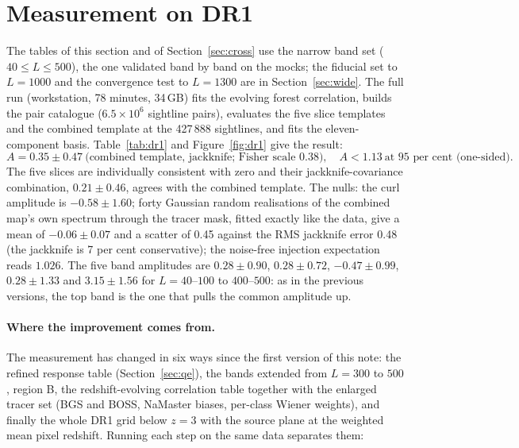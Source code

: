 \documentclass[11pt,a4paper]{article}
\begin{document}
\section{Measurement on DR1}
\label{sec:result}
The tables of this section and of Section~\ref{sec:cross} use the narrow band set ($40\le L\le500$), the one validated band by band on the mocks; the fiducial set to $L=1000$ and the convergence test to $L=1300$ are in Section~\ref{sec:wide}. The full run (workstation, 78 minutes, 34\,GB) fits the evolving forest correlation, builds the pair catalogue ($6.5\times10^6$ sightline pairs), evaluates the five slice templates and the combined template at the 427\,888 sightlines, and fits the eleven-component basis. Table~\ref{tab:dr1} and Figure~\ref{fig:dr1} give the result:
\begin{equation}
A=0.35\pm0.47\ \text{(combined template, jackknife; Fisher scale 0.38)},\quad A<1.13\ \text{at 95 per cent (one-sided)}.
\end{equation}
The five slices are individually consistent with zero and their jackknife-covariance combination, $0.21\pm0.46$, agrees with the combined template. The nulls: the curl amplitude is $-0.58\pm1.60$; forty Gaussian random realisations of the combined map's own spectrum through the tracer mask, fitted exactly like the data, give a mean of $-0.06\pm0.07$ and a scatter of 0.45 against the RMS jackknife error 0.48 (the jackknife is 7 per cent conservative); the noise-free injection expectation reads $1.026$. The five band amplitudes are $0.28\pm0.90$, $0.28\pm0.72$, $-0.47\pm0.99$, $0.28\pm1.33$ and $3.15\pm1.56$ for $L=40$--$100$ to $400$--$500$: as in the previous versions, the top band is the one that pulls the common amplitude up.

\paragraph{Where the improvement comes from.} The measurement has changed in six ways since the first version of this note: the refined response table (Section~\ref{sec:qe}), the bands extended from $L=300$ to $500$, region B, the redshift-evolving correlation table together with the enlarged tracer set (BGS and BOSS, NaMaster biases, per-class Wiener weights), and finally the whole DR1 grid below $z=3$ with the source plane at the weighted mean pixel redshift. Running each step on the same data separates them:
\end{document}
